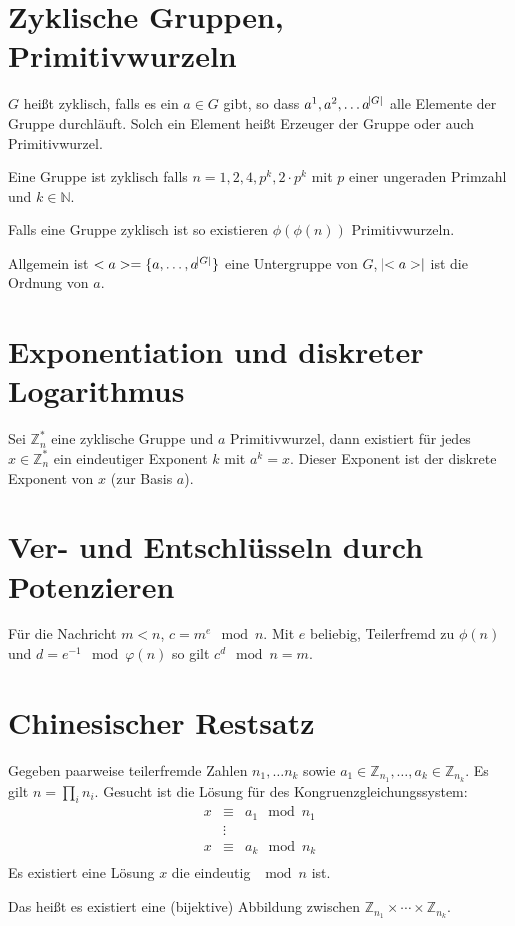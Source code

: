 \section{Zyklische Gruppen, Primitivwurzeln}
$G$ heißt zyklisch, falls es ein $a \in G$ gibt, so dass $a^1, a^2, \ldots a^{\abs{G}}$
alle Elemente der Gruppe durchläuft. Solch ein Element heißt Erzeuger der Gruppe
oder auch Primitivwurzel.

Eine Gruppe ist zyklisch falls $n = 1, 2, 4, p^k, 2\cdot p^k$ mit $p$ einer ungeraden
Primzahl und $k \in \mathbb{N}$.

Falls eine Gruppe zyklisch ist so existieren $\phi(\phi(n))$ Primitivwurzeln.

Allgemein ist $<a> = \{a, \ldots, a^{\abs{G}}\}$ eine Untergruppe von $G$, 
$\abs{<a>}$ ist die Ordnung von $a$.

\section{Exponentiation und diskreter Logarithmus}
Sei $\mathbb{Z}_n^*$ eine zyklische Gruppe und $a$ Primitivwurzel, dann existiert
für jedes $x \in \mathbb{Z}_n^*$ ein eindeutiger Exponent $k$ mit $a^k = x$.
Dieser Exponent ist der diskrete Exponent von $x$ (zur Basis $a$).

\section{Ver- und Entschlüsseln durch Potenzieren}
Für die Nachricht $m < n$, $c=m^e \mod n$. Mit $e$ beliebig, Teilerfremd zu $\phi(n)$
und $d = e^{-1} \mod \varphi(n)$ so gilt $c^d \mod n = m$.

\section{Chinesischer Restsatz}
Gegeben paarweise teilerfremde Zahlen $n_1, \ldots n_k$ sowie $a_1 \in \mathbb{Z}_{n_1}, \ldots, a_k \in \mathbb{Z}_{n_k}$.
Es gilt $n=\prod_i n_i$.
Gesucht ist die Lösung für des Kongruenzgleichungssystem:
\begin{eqnarray}
    x &\equiv& a_1 \mod n_1 \\
    &\vdots& \\
    x &\equiv& a_k \mod n_k \\
\end{eqnarray}
Es existiert eine Lösung $x$ die eindeutig $\mod n$ ist.

Das heißt es existiert eine (bijektive) Abbildung zwischen $\mathbb{Z}_{n_1} \times \cdots \times \mathbb{Z}_{n_k}$.

